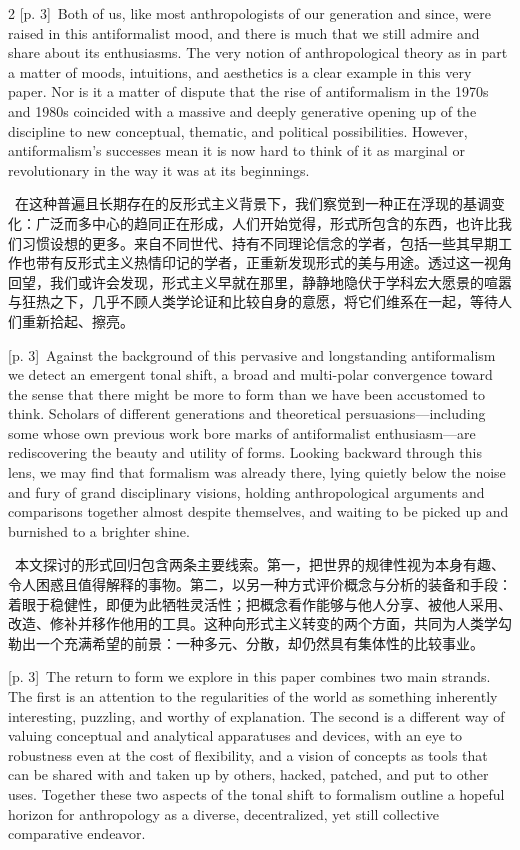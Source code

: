 \documentclass[10pt,a4paper]{article}
\begin{document}
\begin{paracol}{2}
{\scriptsize\color{gray} [p. 3]}\ Both of us, like most anthropologists of our generation and since, were raised in this antiformalist mood, and there is much that we still admire and share about its enthusiasms. The very notion of anthropological theory as in part a matter of moods, intuitions, and aesthetics is a clear example in this very paper. Nor is it a matter of dispute that the rise of antiformalism in the 1970s and 1980s coincided with a massive and deeply generative opening up of the discipline to new conceptual, thematic, and political possibilities. However, antiformalism’s successes mean it is now hard to think of it as marginal or revolutionary in the way it was at its beginnings.\par
\switchcolumn*
{\scriptsize\color{gray} [p. 3]}\ 在这种普遍且长期存在的反形式主义背景下，我们察觉到一种正在浮现的基调变化：广泛而多中心的趋同正在形成，人们开始觉得，形式所包含的东西，也许比我们习惯设想的更多。来自不同世代、持有不同理论信念的学者，包括一些其早期工作也带有反形式主义热情印记的学者，正重新发现形式的美与用途。透过这一视角回望，我们或许会发现，形式主义早就在那里，静静地隐伏于学科宏大愿景的喧嚣与狂热之下，几乎不顾人类学论证和比较自身的意愿，将它们维系在一起，等待人们重新拾起、擦亮。\par
\switchcolumn
{\scriptsize\color{gray} [p. 3]}\ Against the background of this pervasive and longstanding antiformalism we detect an emergent tonal shift, a broad and multi-polar convergence toward the sense that there might be more to form than we have been accustomed to think. Scholars of different generations and theoretical persuasions—including some whose own previous work bore marks of antiformalist enthusiasm—are rediscovering the beauty and utility of forms. Looking backward through this lens, we may find that formalism was already there, lying quietly below the noise and fury of grand disciplinary visions, holding anthropological arguments and comparisons together almost despite themselves, and waiting to be picked up and burnished to a brighter shine.\par
\switchcolumn*
{\scriptsize\color{gray} [p. 3]}\ 本文探讨的形式回归包含两条主要线索。第一，把世界的规律性视为本身有趣、令人困惑且值得解释的事物。第二，以另一种方式评价概念与分析的装备和手段：着眼于稳健性，即便为此牺牲灵活性；把概念看作能够与他人分享、被他人采用、改造、修补并移作他用的工具。这种向形式主义转变的两个方面，共同为人类学勾勒出一个充满希望的前景：一种多元、分散，却仍然具有集体性的比较事业。\par
\switchcolumn
{\scriptsize\color{gray} [p. 3]}\ The return to form we explore in this paper combines two main strands. The first is an attention to the regularities of the world as something inherently interesting, puzzling, and worthy of explanation. The second is a different way of valuing conceptual and analytical apparatuses and devices, with an eye to robustness even at the cost of flexibility, and a vision of concepts as tools that can be shared with and taken up by others, hacked, patched, and put to other uses. Together these two aspects of the tonal shift to formalism outline a hopeful horizon for anthropology as a diverse, decentralized, yet still collective comparative endeavor.\par

\end{paracol}
\end{document}
